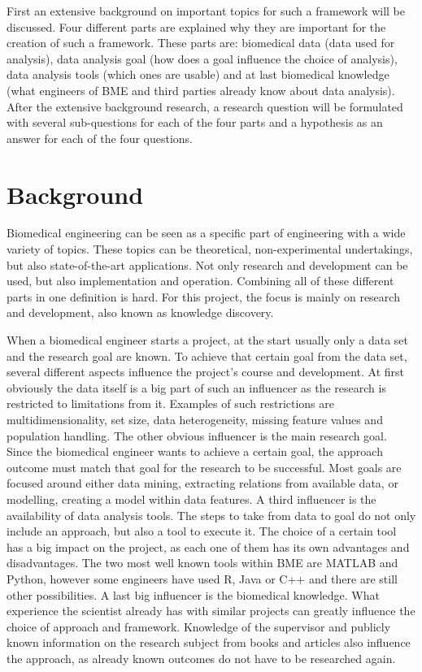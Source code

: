 \documentclass[10pt,a4paper]{article}
\begin{document}
	First an extensive background on important topics for such a framework will be discussed. Four different parts are explained why they are important for the creation of such a framework. These parts are: biomedical data (data used for analysis), data analysis goal (how does a goal influence the choice of analysis), data analysis tools (which ones are usable) and at last biomedical knowledge (what engineers of BME and third parties already know about data analysis). After the extensive background research, a research question will be formulated with several sub-questions for each of the four parts and a hypothesis as an answer for each of the four questions.
	
	\section{Background}
	\label{sec:Background}
	
	Biomedical engineering can be seen as a specific part of engineering with a wide variety of topics. These topics can be theoretical, non-experimental undertakings, but also state-of-the-art applications. Not only research and development can be used, but also implementation and operation. Combining all of these different parts in one definition is hard. \cite{bronzino2014biomedical} For this project, the focus is mainly on research and development, also known as knowledge discovery. \cite{bramer2007principles} 

	
	When a biomedical engineer starts a project, at the start usually only a data set and the research goal are known. To achieve that certain goal from the data set, several different aspects influence the project's course and development. At first obviously the data itself is a big part of such an influencer as the research is restricted to limitations from it. Examples of such restrictions are multidimensionality, set size, data heterogeneity, missing feature values and population handling. The other obvious influencer is the main research goal. Since the biomedical engineer wants to achieve a certain goal, the approach outcome must match that goal for the research to be successful. Most goals are focused around either data mining, extracting relations from available data, or modelling, creating a model within data features. A third influencer is the availability of data analysis tools. The steps to take from data to goal do not only include an approach, but also a tool to execute it. The choice of a certain tool has a big impact on the project, as each one of them has its own advantages and disadvantages. The two most well known tools within BME are MATLAB and Python, however some engineers have used R, Java or C++ and there are still other possibilities. A last big influencer is the biomedical knowledge. What experience the scientist already has with similar projects can greatly influence the choice of approach and framework. Knowledge of the supervisor and publicly known information on the research subject from books and articles also influence the approach, as already known outcomes do not have to be researched again. 
	
\end{document}
